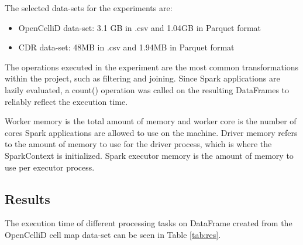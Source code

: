 The selected data-sets for the experiments are:
\begin{itemize}
    \item OpenCelliD data-set: 3.1 GB in .csv  and 1.04GB in Parquet format
    \item CDR data-set: 48MB in .csv and 1.94MB in Parquet format
\end{itemize}

The operations executed in the experiment are the most common transformations within the project, such as filtering and joining. Since Spark applications are lazily evaluated, a count() operation was called on the resulting DataFrames to reliably reflect the execution time.

\begin{table}[h]
    \centering
    \caption{Specifications of test clusters}
    \label{tab:spec}
\end{table}

Worker memory is the total amount of memory and worker core is the number of cores Spark applications are allowed to use on the machine. Driver memory refers to the amount of memory to use for the driver process, which is where the SparkContext is initialized. Spark executor memory is the amount of memory to use per executor process. 
\cite{spark:rdds}

\subsection{Results}
The execution time of different processing tasks on DataFrame created from the OpenCelliD cell map data-set can be seen in Table \ref{tab:res}.

